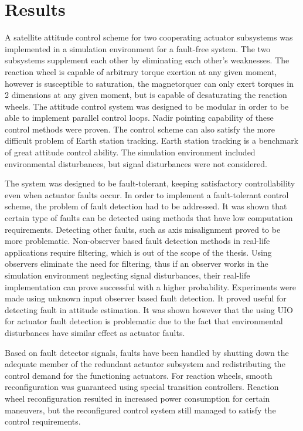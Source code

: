 \chapter{Results}

A satellite attitude control scheme for two cooperating actuator subsystems was implemented in a simulation environment for a fault-free system. The two subsystems supplement each other by eliminating each other's weaknesses. The reaction wheel is capable of arbitrary torque exertion at any given moment, however is susceptible to saturation, the magnetorquer can only exert torques in 2 dimensions at any given moment, but is capable of desaturating the reaction wheels. The attitude control system was designed to be modular in order to be able to implement parallel control loops.
Nadir pointing capability of these control methods were proven. The control scheme can also satisfy the more difficult problem of Earth station tracking. Earth station tracking is a benchmark of great attitude control ability. The simulation environment included environmental disturbances, but signal disturbances were not considered. 

The system was designed to be fault-tolerant, keeping satisfactory controllability even when actuator faults occur. In order to implement a fault-tolerant control scheme, the problem of fault detection had to be addressed. It was shown that certain type of faults can be detected using methods that have low computation requirements. Detecting other faults, such as axis misalignment proved to be more problematic. Non-observer based fault detection methods in real-life applications require filtering, which is out of the scope of the thesis. Using observers eliminate the need for filtering, thus if an observer works in the simulation environment neglecting signal disturbances, their real-life implementation can prove successful with a higher probability. Experiments were made using unknown input observer based fault detection. It proved useful for detecting fault in attitude estimation. It was shown however that the using UIO for actuator fault detection is problematic due to the fact that environmental disturbances have similar effect as actuator faults.

Based on fault detector signals, faults have been handled by shutting down the adequate member of the redundant actuator subsystem and redistributing the control demand for the functioning actuators. For reaction wheels, smooth reconfiguration was guaranteed using special transition controllers. Reaction wheel reconfiguration resulted in increased power consumption for certain maneuvers, but the reconfigured control system still managed to satisfy the control requirements.


